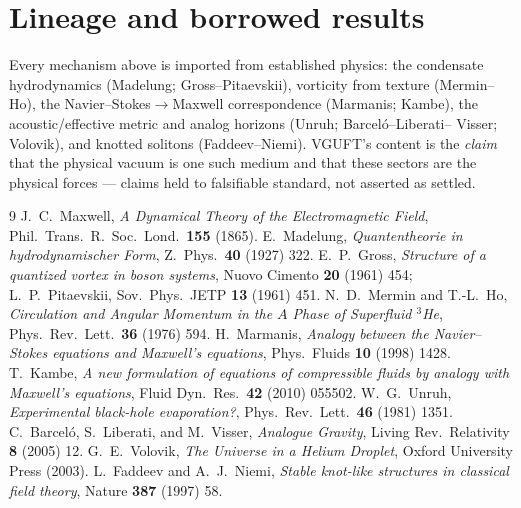 \documentclass[11pt]{article}
\begin{document}
\section*{Lineage and borrowed results}
\label{sec:lineage}
Every mechanism above is imported from established physics: the condensate
hydrodynamics (Madelung; Gross--Pitaevskii), vorticity from texture
(Mermin--Ho), the Navier--Stokes$\to$Maxwell correspondence (Marmanis; Kambe),
the acoustic/effective metric and analog horizons (Unruh; Barcel\'o--Liberati--
Visser; Volovik), and knotted solitons (Faddeev--Niemi). VGUFT's content is the
\emph{claim} that the physical vacuum is one such medium and that these sectors
are the physical forces --- claims held to falsifiable standard, not asserted as
settled.

\begin{thebibliography}{9}
   J.~C.~Maxwell, \emph{A Dynamical Theory of the
    Electromagnetic Field}, Phil.\ Trans.\ R.\ Soc.\ Lond.\ \textbf{155} (1865).
   E.~Madelung, \emph{Quantentheorie in hydrodynamischer
    Form}, Z.\ Phys.\ \textbf{40} (1927) 322.
   E.~P.~Gross, \emph{Structure of a quantized vortex in boson
    systems}, Nuovo Cimento \textbf{20} (1961) 454;
    L.~P.~Pitaevskii, Sov.\ Phys.\ JETP \textbf{13} (1961) 451.
   N.~D.~Mermin and T.-L.~Ho, \emph{Circulation and Angular
    Momentum in the $A$ Phase of Superfluid $^3$He}, Phys.\ Rev.\ Lett.\
    \textbf{36} (1976) 594.
   H.~Marmanis, \emph{Analogy between the Navier--Stokes
    equations and Maxwell's equations}, Phys.\ Fluids \textbf{10} (1998) 1428.
  \bibitem{kambe} T.~Kambe, \emph{A new formulation of equations of compressible
    fluids by analogy with Maxwell's equations}, Fluid Dyn.\ Res.\ \textbf{42}
    (2010) 055502.
   W.~G.~Unruh, \emph{Experimental black-hole evaporation?},
    Phys.\ Rev.\ Lett.\ \textbf{46} (1981) 1351.
   C.~Barcel\'o, S.~Liberati, and M.~Visser, \emph{Analogue
    Gravity}, Living Rev.\ Relativity \textbf{8} (2005) 12.
   G.~E.~Volovik, \emph{The Universe in a Helium Droplet},
    Oxford University Press (2003).
   L.~Faddeev and A.~J.~Niemi, \emph{Stable knot-like
    structures in classical field theory}, Nature \textbf{387} (1997) 58.
\end{thebibliography}
\end{document}
